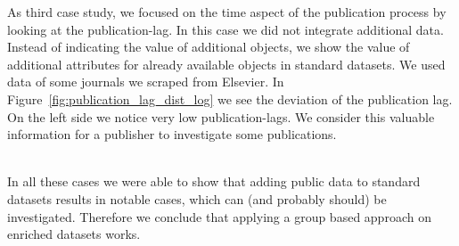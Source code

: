 \documentclass{ou-report}
\newcommand{\doi}{{DOI}}
\begin{document}
As third case study, we focused on the time aspect of the publication process by 
looking at the publication-lag. In this case we did not integrate additional 
data. Instead of indicating the value of additional objects, we show the value 
of additional attributes for already available objects in standard datasets. We 
used data of some journals we scraped from Elsevier. In 
Figure~\ref{fig:publication_lag_dist_log} we see the deviation of the 
publication lag. On the left side we notice very low publication-lags. We 
consider this valuable information for a publisher to investigate some 
publications.

\ \\
In all these cases we were able to show that adding public data to standard 
datasets results in notable cases, which can (and probably should) be 
investigated. Therefore we conclude that applying a group based approach on 
enriched datasets works.










\end{document}

